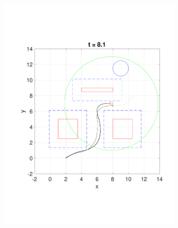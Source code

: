 \begin{figure}
  \begin{subfigure}[t]{0.49\columnwidth}
    \includegraphics[width=\columnwidth]{fig/Q8D_Q4D/81}
  \end{subfigure}
  \begin{subfigure}[t]{0.49\columnwidth}

\end{subfigure}
\end{figure}
